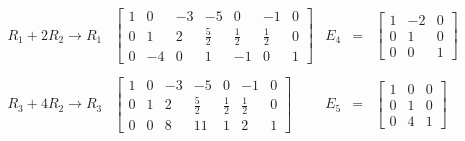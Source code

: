 \begin{enumerate}[\bfseries 1.]
$$\begin{array}{rlrcl}
	    R_1+2R_2\to R_1&
	    \left[
		\begin{array}{rrrr|rrr}
		    1 & 0 & -3 & -5 & 0 & -1 & 0 \\
		    0 & 1 & 2 & \frac{5}{2} & \frac{1}{2} & \frac{1}{2} & 0 \\
		    0 & -4 & 0 & 1 & -1 & 0 & 1
		\end{array}
	    \right]
	    &E_4&=&
	    \left[
		\begin{array}{rrr}
		    1&-2&0\\
		    0&1&0\\
		    0&0&1
		\end{array}
	    \right]\\\\
	    R_3+4R_2\to R_3&
	    \left[
		\begin{array}{rrrr|rrr}
		    1 & 0 & -3 & -5 & 0 & -1 & 0 \\
		    0 & 1 & 2 & \frac{5}{2} & \frac{1}{2} & \frac{1}{2} & 0 \\
		    0 & 0 & 8 & 11& 1& 2 & 1
		\end{array}
	    \right]
	    &E_5&=&
	    \left[
		\begin{array}{rrr}
		    1&0&0\\
		    0&1&0\\
		    0&4&1
		\end{array}
	    \right]\\\\

	\end{array}
	$$


\end{enumerate}
